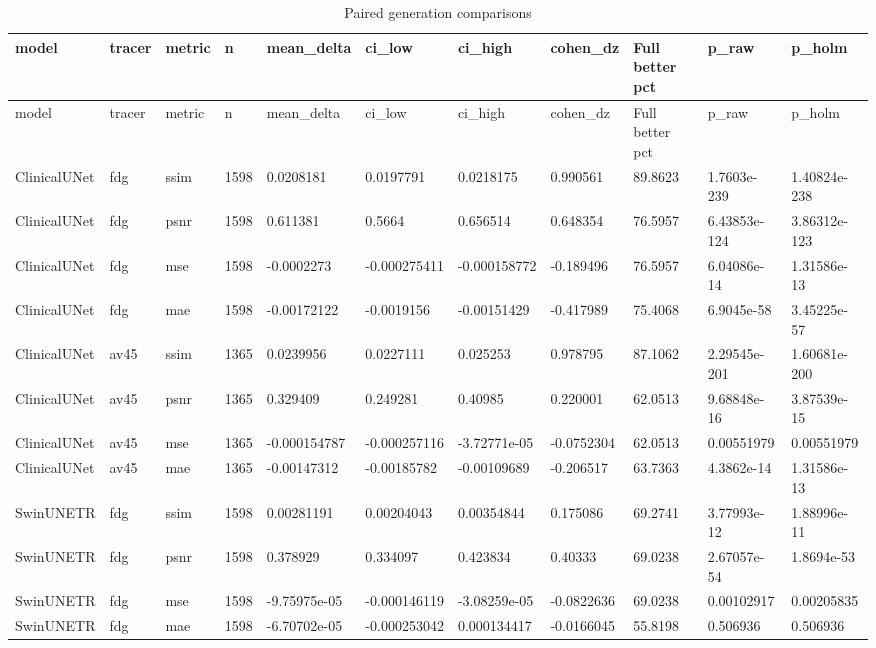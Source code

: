 \begin{landscape}
\begingroup
\footnotesize
\setlength{\tabcolsep}{4pt}
\begin{longtable}{lllllllllll}
\caption{Paired generation comparisons}\label{tab:s-n03}\\
\toprule
model & tracer & metric & n & mean\_delta & ci\_low & ci\_high & cohen\_dz & Full better pct & p\_raw & p\_holm \\
\midrule
\endfirsthead
\toprule
model & tracer & metric & n & mean\_delta & ci\_low & ci\_high & cohen\_dz & Full better pct & p\_raw & p\_holm \\
\midrule
\endhead
\bottomrule
\endfoot
ClinicalUNet & fdg & ssim & 1598 & 0.0208181 & 0.0197791 & 0.0218175 & 0.990561 & 89.8623 & 1.7603e-239 & 1.40824e-238 \\
ClinicalUNet & fdg & psnr & 1598 & 0.611381 & 0.5664 & 0.656514 & 0.648354 & 76.5957 & 6.43853e-124 & 3.86312e-123 \\
ClinicalUNet & fdg & mse & 1598 & -0.0002273 & -0.000275411 & -0.000158772 & -0.189496 & 76.5957 & 6.04086e-14 & 1.31586e-13 \\
ClinicalUNet & fdg & mae & 1598 & -0.00172122 & -0.0019156 & -0.00151429 & -0.417989 & 75.4068 & 6.9045e-58 & 3.45225e-57 \\
ClinicalUNet & av45 & ssim & 1365 & 0.0239956 & 0.0227111 & 0.025253 & 0.978795 & 87.1062 & 2.29545e-201 & 1.60681e-200 \\
ClinicalUNet & av45 & psnr & 1365 & 0.329409 & 0.249281 & 0.40985 & 0.220001 & 62.0513 & 9.68848e-16 & 3.87539e-15 \\
ClinicalUNet & av45 & mse & 1365 & -0.000154787 & -0.000257116 & -3.72771e-05 & -0.0752304 & 62.0513 & 0.00551979 & 0.00551979 \\
ClinicalUNet & av45 & mae & 1365 & -0.00147312 & -0.00185782 & -0.00109689 & -0.206517 & 63.7363 & 4.3862e-14 & 1.31586e-13 \\
SwinUNETR & fdg & ssim & 1598 & 0.00281191 & 0.00204043 & 0.00354844 & 0.175086 & 69.2741 & 3.77993e-12 & 1.88996e-11 \\
SwinUNETR & fdg & psnr & 1598 & 0.378929 & 0.334097 & 0.423834 & 0.40333 & 69.0238 & 2.67057e-54 & 1.8694e-53 \\
SwinUNETR & fdg & mse & 1598 & -9.75975e-05 & -0.000146119 & -3.08259e-05 & -0.0822636 & 69.0238 & 0.00102917 & 0.00205835 \\
SwinUNETR & fdg & mae & 1598 & -6.70702e-05 & -0.000253042 & 0.000134417 & -0.0166045 & 55.8198 & 0.506936 & 0.506936 \\

\end{longtable}
\end{landscape}
